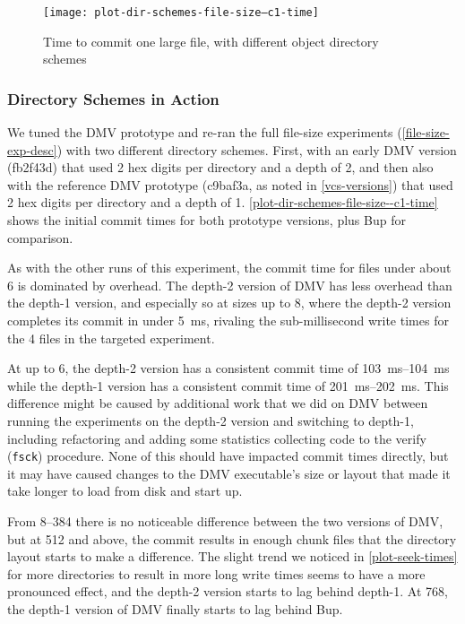 %

\begin{figure}[b!]
    \caption{Time to commit one large file, with different object directory
    schemes}
    \label{plot-dir-schemes-file-size--c1-time}
    \centering

    \explainlogsubfig

    \texttt{[image: plot-dir-schemes-file-size--c1-time]}
\end{figure}

\subsubsection{Directory Schemes in Action}

We tuned the DMV prototype and re-ran the full file-size experiments
(\autoref{file-size-exp-desc}) with two different directory schemes. First, with
an early DMV version (fb2f43d) that used \num{2} hex digits per directory and a
depth of \num{2}, and then also with the reference DMV prototype (c9baf3a, as
noted in \autoref{vcs-versions}) that used \num{2} hex digits per directory and
a depth of \num{1}. \autoref{plot-dir-schemes-file-size--c1-time} shows the
initial commit times for both prototype versions, plus Bup for comparison.

As with the other runs of this experiment, the commit time for files under about
\SI{6}{\mib} is dominated by overhead. The depth-\num{2} version of DMV has less
overhead than the depth-\num{1} version, and especially so at sizes up to
\SI{8}{\kib}, where the depth-\num{2} version completes its commit in under
\SI{5}{\ms}, rivaling the sub-millisecond write times for the \SI{4}{\kib} files
in the targeted experiment.

At up to \SI{6}{\mib}, the depth-\num{2} version has a consistent commit time of
\SIrange{103}{104}{\ms} while the depth-\num{1} version has a consistent commit
time of \SIrange{201}{202}{\ms}. This difference might be caused by additional
work that we did on DMV between running the experiments on the depth-\num{2}
version and switching to depth-\num{1}, including refactoring and adding some
statistics collecting code to the verify (\lstinline{fsck}) procedure. None of
this should have impacted commit times directly, but it may have caused changes
to the DMV executable's size or layout that made it take longer to load from
disk and start up.

From \SIrange{8}{384}{\mib} there is no noticeable difference between the two
versions of DMV, but at \SI{512}{\mib} and above, the commit results in enough
chunk files that the directory layout starts to make a difference. The slight
trend we noticed in \autoref{plot-seek-times} for more directories to result in
more long write times seems to have a more pronounced effect, and the
depth-\num{2} version starts to lag behind depth-\num{1}. At \SI{768}{\mib}, the
depth-\num{1} version of DMV finally starts to lag behind Bup.

